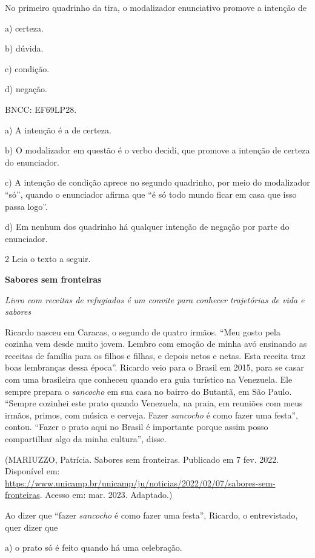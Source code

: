 
No primeiro quadrinho da tira, o modalizador enunciativo promove a
intenção de

a) certeza.

b) dúvida.

c) condição.

d) negação.

BNCC: EF69LP28.

a) A intenção é a de certeza.

b) O modalizador em questão é o verbo decidi, que promove a intenção de
certeza do enunciador.

c) A intenção de condição aprece no segundo quadrinho, por meio do
modalizador ``só'', quando o enunciador afirma que ``é só todo mundo
ficar em casa que isso passa logo''.

d) Em nenhum dos quadrinho há qualquer intenção de negação por parte do
enunciador.

\num{2} Leia o texto a seguir.

\textbf{Sabores sem fronteiras}

\emph{Livro com receitas de refugiados é um convite para conhecer
trajetórias de vida e sabores}

Ricardo nasceu em Caracas, o segundo de quatro irmãos. ``Meu gosto pela
cozinha vem desde muito jovem. Lembro com emoção de minha avó ensinando
as receitas de família para os filhos e filhas, e depois netos e netas.
Esta receita traz boas lembranças dessa época''. Ricardo veio para o
Brasil em 2015, para se casar com uma brasileira que conheceu quando era
guia turístico na Venezuela. Ele sempre prepara o \emph{sancocho} em sua
casa no bairro do Butantã, em São Paulo. ``Sempre cozinhei este prato
quando Venezuela, na praia, em reuniões com meus irmãos, primos, com
música e cerveja. Fazer \emph{sancocho} é como fazer uma festa'',
contou. ``Fazer o prato aqui no Brasil é importante porque assim posso
compartilhar algo da minha cultura'', disse.

(MARIUZZO, Patrícia. Sabores sem fronteiras. Publicado em 7 fev. 2022.
Disponível em:
\url{https://www.unicamp.br/unicamp/ju/noticias/2022/02/07/sabores-sem-fronteiras}.
Acesso em: mar. 2023. Adaptado.)

Ao dizer que ``fazer \emph{sancocho} é como fazer uma festa'', Ricardo,
o entrevistado, quer dizer que

a) o prato só é feito quando há uma celebração.

